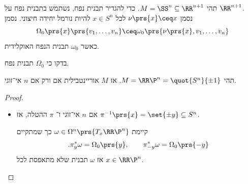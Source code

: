 \documentclass[a4paper,10pt,twoside,openany]{book}
\begin{document}
\begin{example}
תהי
$M = \SS^n \subseteq \RR^{n+1}$.
כדי להגדיר תבנית נפח, נשתמש בתבנית נפח על
$\RR^{n+1}$.\\
נסמן
$\nu \prs{x} \ceq x$
לכל
$x \in S^n$
להיות נורמל יחידה חיצוני.
נסמן
\[\Omega_0\prs{x} \prs{v_1, \ldots, v_n} \ceq \omega_0\prs{\nu\prs{x}, v_1, \ldots, v_n}\]
כאשר
$\omega_0$
תבנית הנפח האוקלידית.
\end{example}
\begin{exercise}
בדקו כי
$\Omega_0$
תבנית נפח.
\end{exercise}
\begin{theorem}
תהי
$M = \RR\P^n = \quot{S^n}{\pm 1}$.
אז
$M$
אוריינטבילית אם ורק אם
$n$
אי־זוגי.
\end{theorem}
\begin{proof}
\begin{itemize}
\item אם
$n$
אי־זוגי ו־%
$\pi$
ההטלה, אז
$\pi^{-1}\prs{x} = \set{\pm y} \subseteq S^n$.
\begin{exercise}
קיימת
$\omega \in \Omega^n\prs{T_x \RR\P^n}$
כך שמתקיים
\[\text{.}\pi_y^*\omega = \Omega_0\prs{y}, \qquad \pi_{-y}^* \omega = \Omega_0\prs{-y}\]
אז
$\omega$
תבנית שלא מתאפסת לכל
$x \in \RR\P^n$.


\end{exercise}
\end{itemize}
\end{proof}
\end{document}
